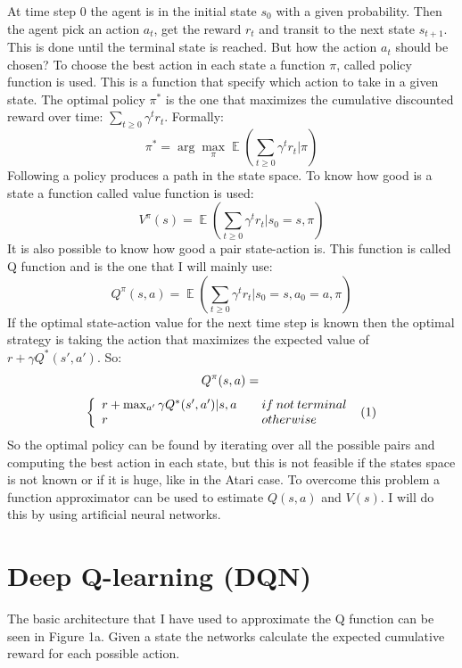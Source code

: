 \documentclass[10pt]{article}
\newcommand\inlineeqno{\stepcounter{equation}\ (\theequation)}
\newcommand{\expect}{\mathop{\mathbb{E}}\nolimits}
\begin{document}
\begin{multicols}{2}
At time step 0 the agent is in the initial state $s_0$ with a given probability. Then the agent pick an action $a_t$, get the reward $r_t$ and transit to the next state $s_{t+1}$. This is done until the terminal state is reached. But how the action $a_t$ should be chosen? To choose the best action in each state a function $\pi$, called policy function is used. This is a  function that specify which action to take in a given state. The optimal policy $\pi^*$ is the one that maximizes the cumulative discounted reward over time: $\sum_{t\ge0} \gamma^tr_t$.  Formally: 
\[
\pi^* = \arg \max_\pi \expect(\sum_{t\ge0} \gamma^tr_t | \pi)
\]
Following a policy produces a path in the state space. To know how good is a state a function called value function is used:
\[
V^\pi(s) =\expect(\sum_{t\ge0} \gamma^tr_t|s_0 = s,\pi )
\]
It is also possible to know how good a pair state-action is. This function is called Q function and is the one that I will mainly use:
\[
Q^\pi(s, a) =\expect(\sum_{t\ge0} \gamma^tr_t|s_0 = s, a_0 = a, \pi )
\]
 If the optimal state-action value for the next time step is known then the optimal strategy is taking the action that maximizes the expected value of $r + \gamma Q^*(s', a')$. So: 
\[
Q^\pi(s, a)=\\
\]
\[ \left\{
\begin{array}{ll}
r+ \max_{a'} \gamma Q^* (s', a')|s, a & \quad	  if \: not \: terminal \\
r & \quad otherwise
\end{array}
\right. \inlineeqno
\] 
So the optimal policy can be found by iterating over all the possible pairs and computing the best action in each state, but this is not feasible if the states space is not known or if it is huge, like in the Atari case. To overcome this problem a function approximator can be used to estimate $Q(s, a)$ and $V(s)$. I will do this by using artificial neural networks.

\section{Deep Q-learning (DQN)}
The basic architecture that I have used to approximate the Q function can be seen in Figure 1a. Given a state the networks calculate the expected cumulative reward for each possible action.%


\end{multicols}
\end{document}
